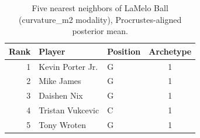\begin{table}[htbp]
  \centering\small
  \begin{tabular}{rllc}
    \toprule
    Rank & Player & Position & Archetype \\
    \midrule
    1 & Kevin Porter Jr. & G & 1 \\
    2 & Mike James & G & 1 \\
    3 & Daishen Nix & G & 1 \\
    4 & Tristan Vukcevic & C & 1 \\
    5 & Tony Wroten & G & 1 \\
    \bottomrule
  \end{tabular}
  \caption{Five nearest neighbors of LaMelo Ball (curvature_m2 modality), Procrustes-aligned posterior mean.}
  \label{tab:LaMelo_Ball_neighbors_curvature_m2}
\end{table}

